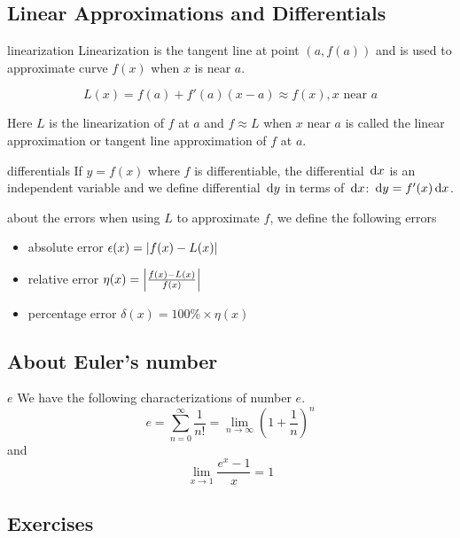 \documentclass[Calculus 1 Recitation.tex]{subfiles}
\begin{document}
\subsection{Linear Approximations and Differentials}

\begin{myleftlinebox}
	linearization
	\tcblower
	Linearization is the tangent line at point $(a,f(a))$ and is used to approximate curve $f(x)$ when $x$ is near $a$.

	\[L(x)=f(a)+f'(a)(x-a)\approx f(x), x \text{ near }a\]

	Here $L$ is the linearization of $f$ at $a$ and $f\approx L$ when $x$ near $a$ is called the linear approximation or tangent line approximation of $f$ at $a$.
\end{myleftlinebox}

\begin{myleftlinebox}
	differentials
	\tcblower
	If $y=f(x)$ where $f$ is differentiable, the differential $\,\mathrm{d} x$ is an independent variable and we define differential $\,\mathrm{d} y$ in terms of $\,\mathrm{d} x$: $\,\mathrm{d} y=f'(x)\,\mathrm{d} x$.
\end{myleftlinebox}

\begin{myleftlinebox}
	about the errors
	\tcblower
	when using $L$ to approximate $f$, we define the following errors
	\begin{itemize}
		\item absolute error $\epsilon(x)=\left\vert f(x)-L(x)\right\vert$
		\item relative error $\eta(x) =   \left\vert\frac{f(x)-L(x)}{f(x)}\right\vert$
		\item percentage error $\delta(x)=100\% \times \eta(x)$
	\end{itemize}
\end{myleftlinebox}

\subsection{About Euler's number}

\begin{myleftlinebox}
	$e$
	\tcblower
	We have the following characterizations of number $e$.
	\[e=\sum_{n=0}^\infty \frac{1}{n!}=\lim_{n\to\infty}(1+\frac{1}{n})^n\]
	and
	\[\lim_{x\to 1}\frac{e^x-1}{x}=1\]
\end{myleftlinebox}

\subsection{Exercises}
\end{document}
